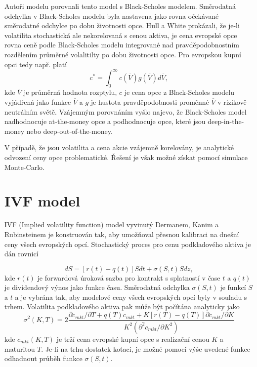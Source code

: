 \documentclass[a4paper]{book}
\begin{document}
Autoři modelu porovnali tento model s Black-Scholes modelem.  Směrodatná odchylka v Black-Scholes modelu byla nastavena jako rovna očekávané směrodatné odchylce po dobu životnosti opce. Hull a White prokázali, že je-li volatilita stochastická ale nekorelovaná s cenou aktiva, je cena evropské opce rovna ceně podle Black-Scholes modelu integrované nad pravděpodobnostním rozdělením průměrné volalitilty po dobu životnosti opce. Pro evropskou kupní opci tedy např. platí
\begin{equation*}
c^* = \int^{\infty}_0 c(\overline{V})g(\overline{V})d\overline{V},
\end{equation*}
kde $\overline{V}$ je průměrná hodnota rozptylu, $c$ je cena opce z Black-Scholes modelu vyjádřená jako funkce $\overline{V}$ a $g$ je hustota pravděpodobnosti proměnné $\overline{V}$ v rizikově neutrálním světě. Vzájemným porovnáním vyšlo najevo, že Black-Scholes model nadhodnocuje at-the-money opce a podhodnocuje opce, které jsou deep-in-the-money nebo deep-out-of-the-money.

V případě, že jsou volatilita a cena akcie vzájemně korelovány, je analytické odvození ceny opce problematické. Řešení je však možné získat pomocí simulace Monte-Carlo.

\section{IVF model}
IVF (Implied volatility function) model vyvinutý Dermanem, Kanim a Rubinsteinem je konstruován tak, aby umožňoval přesnou kalibraci na dnešní ceny všech evropských opcí. Stochastický proces pro cenu podkladového aktiva je dán rovnicí

\begin{equation*}
dS = [r(t) - q(t)]S dt + \sigma(S,t)S dz,
\end{equation*}
kde $r(t)$ je forwardová úroková sazba pro kontrakt s splatností v čase $t$ a $q(t)$ je dividendový výnos jako funkce času. Směrodatná odchylka $\sigma(S,t)$ je funkcí $S$ a $t$ a je vybrána tak, aby modelové ceny všech evropských opcí byly v souladu s trhem. Volatilita podkladového aktiva pak může být počítána analyticky jako
\begin{equation*}
\sigma^2(K,T)=2\frac{\partial c_{mkt}/\partial T + q(T)c_{mkt} + K[r(T)-q(T)]\partial c_{mkt}/\partial K}{K^2(\partial^2 c_{mkt}/\partial K^2)}
\end{equation*}
kde $c_{mkt}(K,T)$ je trží cena evropské kupní opce s realizační cenou $K$ a maturitou $T$. Je-li na trhu dostatek kotací, je možné pomocí výše uvedené funkce odhadnout průběh funkce $\sigma(S,t)$.
\end{document}
